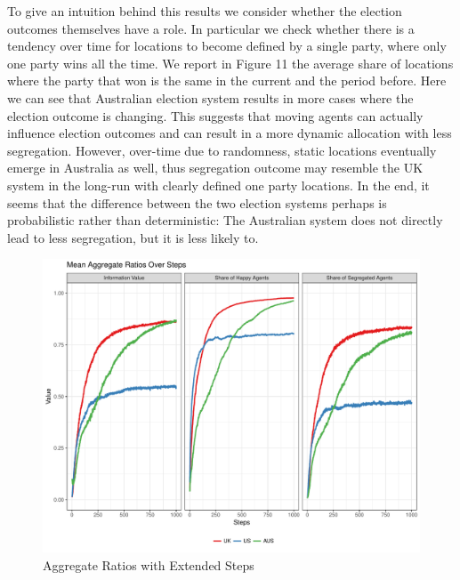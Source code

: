 \documentclass[12pt, a4paper]{article}
\begin{document}
	To give an intuition behind this results we consider whether the election outcomes themselves have a role. In particular we check whether there is a tendency over time for locations to become defined by a single party, where only one party wins all the time. We report in Figure 11 the average share of locations where the party that won is the same in the current and the period before. Here we can see that Australian election system results in more cases where the election outcome is changing. This suggests that moving agents can actually influence election outcomes and can result in a more dynamic allocation with less segregation. However, over-time due to randomness, static locations eventually emerge in Australia as well, thus segregation outcome may resemble the UK system in the long-run with clearly defined one party locations. In the end, it seems that the difference between the two election systems perhaps is probabilistic rather than deterministic: The Australian system does not directly lead to less segregation, but it is less likely to. 
	
	\begin{figure}[bp!]
		\centering
		\caption{Aggregate Ratios with Extended Steps}
		\includegraphics[scale=0.6]{./Plots/agg_ratios_1000.pdf}
	\end{figure}
	
\end{document}

